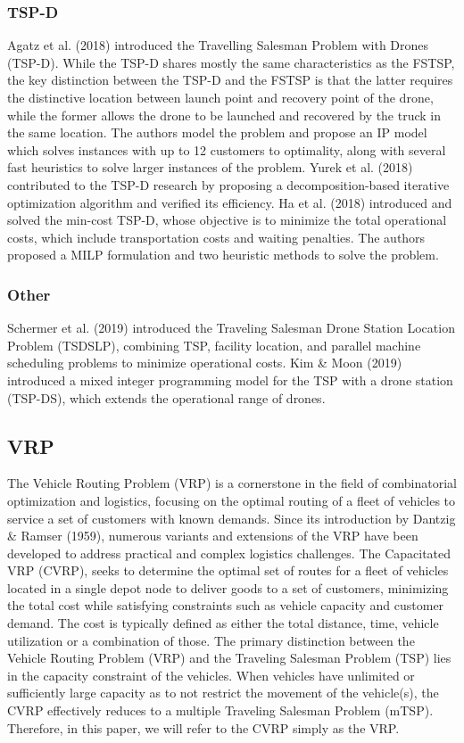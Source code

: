 \documentclass[twocolumn]{article}
\begin{document}
	\subsubsection{TSP-D}
	Agatz et al. (2018) introduced the Travelling Salesman Problem with Drones (TSP-D). While the TSP-D shares mostly the same characteristics as the FSTSP, the key distinction between the TSP-D and the FSTSP is that the latter requires the distinctive location between launch point and recovery point of the drone, while the former allows the drone to be launched and recovered by the truck in the same location. The authors model the problem and propose an IP model which solves instances with up to 12 customers to optimality, along with several fast heuristics to solve larger instances of the problem. Yurek et al. (2018) contributed to the TSP-D research by proposing a decomposition-based iterative optimization algorithm and verified its efficiency. Ha et al. (2018) introduced and solved the min-cost TSP-D, whose objective is to minimize the total operational costs, which include  transportation costs and waiting penalties. The authors proposed a MILP formulation and two heuristic methods to solve the problem.
	\subsubsection{Other}
	Schermer et al. (2019) introduced the Traveling Salesman Drone Station Location Problem (TSDSLP), combining TSP, facility location, and parallel machine scheduling problems to minimize operational costs. 
	Kim \& Moon (2019) introduced a mixed integer programming model for the TSP with a drone station (TSP-DS), which extends the operational range of drones. 
	\par 
	
	\subsection{VRP}
	The Vehicle Routing Problem (VRP) is a cornerstone in the field of combinatorial optimization and logistics, focusing on the optimal routing of a fleet of vehicles to service a set of customers with known demands. Since its introduction by Dantzig \& Ramser (1959), numerous variants and extensions of the VRP have been developed to address practical and complex logistics challenges.
	The Capacitated VRP (CVRP), seeks to determine the optimal set of routes for a fleet of vehicles located in a single depot node to deliver goods to a set of customers, minimizing the total cost while satisfying constraints such as vehicle capacity and customer demand. The cost is typically defined as either the total distance, time, vehicle utilization or a combination of those.
	The primary distinction between the Vehicle Routing Problem (VRP) and the Traveling Salesman Problem (TSP) lies in the capacity constraint of the vehicles. When vehicles have unlimited or sufficiently large capacity as to not restrict the movement of the vehicle(s), the CVRP effectively reduces to a multiple Traveling Salesman Problem (mTSP). Therefore, in this paper, we will refer to the CVRP simply as the VRP.
\end{document}
